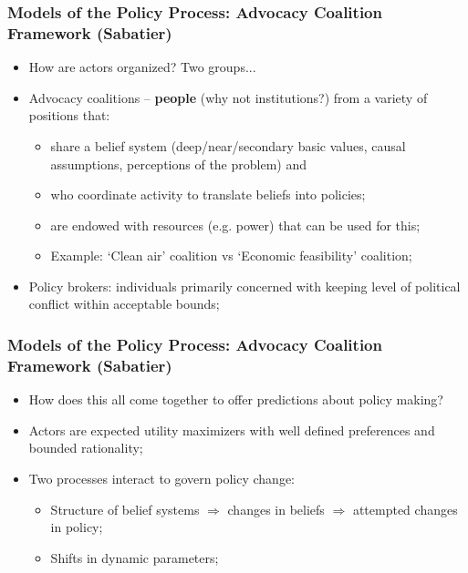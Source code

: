 \documentclass[aspectratio=169]{beamer}
\theoremstyle{principle}
\begin{document}
\begin{frame}
\frametitle{Models of the Policy Process: Advocacy Coalition Framework (Sabatier)}

\begin{itemize}
\item How are actors organized?  Two groups...
\bigskip
\item Advocacy coalitions --  \textbf{people} (why not institutions?) from a variety of positions that:
\begin{itemize} 
\item share a belief system (deep/near/secondary basic values, causal assumptions, perceptions of the problem) and 
\item who coordinate activity to translate beliefs into policies;
\item are endowed with resources (e.g. power) that can be used for this;
\item Example: `Clean air' coalition vs `Economic feasibility' coalition;
\end{itemize}
\bigskip
\item Policy brokers: individuals primarily concerned with keeping level of political conflict within acceptable bounds;
\end{itemize}

\end{frame}

\begin{frame}
\frametitle{Models of the Policy Process: Advocacy Coalition Framework (Sabatier)}

\begin{itemize}
\item How does this all come together to offer predictions about policy making?
\bigskip
\bigskip
\item Actors are expected utility maximizers with well defined preferences and bounded rationality;
\bigskip
\bigskip
\item Two processes interact to govern policy change:
\begin{itemize}
\item Structure of belief systems $\Rightarrow$ changes in beliefs $\Rightarrow$ attempted changes in policy;
\item Shifts in dynamic parameters;
\end{itemize}


\end{itemize}

\end{frame}
\end{document}
